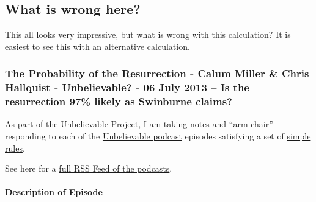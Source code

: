 



\subsection{What is wrong here?}

This all looks very impressive, but what is wrong with this calculation?  It is easiest to see this with an alternative calculation.  


\subsubsection{The Probability of the Resurrection - Calum Miller \&
Chris Hallquist - Unbelievable? - 06 July 2013 -- Is the resurrection
97\% likely as Swinburne
claims?}\label{theprobabilityoftheresurrection-calummillerchrishallquist-unbelievable-06july2013--istheresurrection97likleyasswinburneclaims}

As part of the
\href{http://brianblais.wordpress.com/2013/02/27/unbelievable-project-a-non-believers-armchair-perspective-on-six-years-of-christian-debates/}{Unbelievable
Project}, I am taking notes and ``arm-chair'' responding to each of the
\href{http://www.premierradio.org.uk/shows/saturday/unbelievable.aspx}{Unbelievable
podcast} episodes satisfying a set of
\href{http://brianblais.wordpress.com/2013/02/27/unbelievable-project-a-non-believers-armchair-perspective-on-six-years-of-christian-debates/}{simple
rules}.

See here for a
\href{http://ondemand.premier.org.uk/unbelievable/AudioFeed.aspx}{full
RSS Feed of the podcasts}.

\paragraph{Description of Episode}\label{descriptionofepisode}

